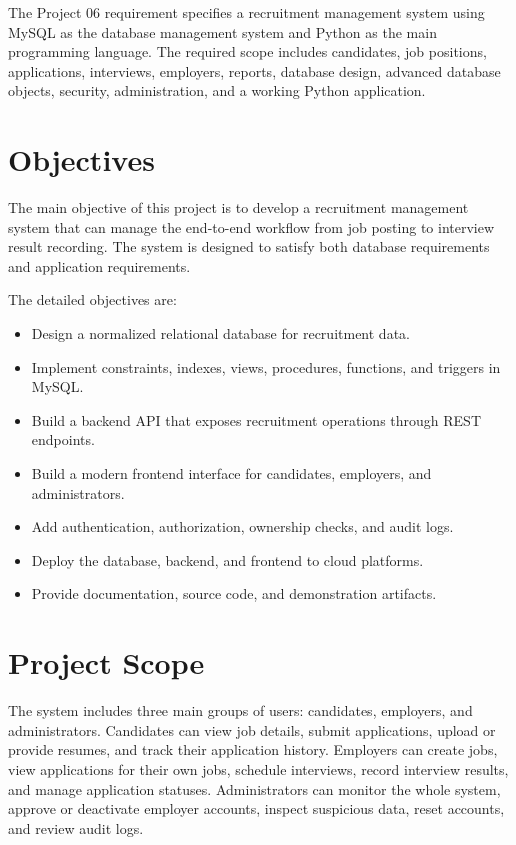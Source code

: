 \documentclass[11pt,a4paper]{report}
\begin{document}
The Project 06 requirement specifies a recruitment management system using MySQL as the database management system and Python as the main programming language. The required scope includes candidates, job positions, applications, interviews, employers, reports, database design, advanced database objects, security, administration, and a working Python application.

\section{Objectives}

The main objective of this project is to develop a recruitment management system that can manage the end-to-end workflow from job posting to interview result recording. The system is designed to satisfy both database requirements and application requirements.

The detailed objectives are:

\begin{itemize}[leftmargin=1.5cm]
  \item Design a normalized relational database for recruitment data.
  \item Implement constraints, indexes, views, procedures, functions, and triggers in MySQL.
  \item Build a backend API that exposes recruitment operations through REST endpoints.
  \item Build a modern frontend interface for candidates, employers, and administrators.
  \item Add authentication, authorization, ownership checks, and audit logs.
  \item Deploy the database, backend, and frontend to cloud platforms.
  \item Provide documentation, source code, and demonstration artifacts.
\end{itemize}

\section{Project Scope}

The system includes three main groups of users: candidates, employers, and administrators. Candidates can view job details, submit applications, upload or provide resumes, and track their application history. Employers can create jobs, view applications for their own jobs, schedule interviews, record interview results, and manage application statuses. Administrators can monitor the whole system, approve or deactivate employer accounts, inspect suspicious data, reset accounts, and review audit logs.
\end{document}
